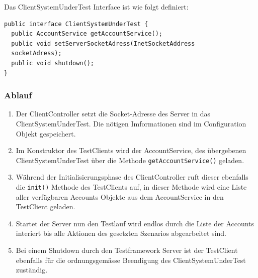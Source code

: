 Das ClientSystemUnderTest Interface ist wie folgt definiert:
\begin{verbatim}
public interface ClientSystemUnderTest {	
  public AccountService getAccountService();
  public void setServerSocketAdress(InetSocketAddress 
  socketAdress);
  public void shutdown();
}	
\end{verbatim}
\subsubsection{Ablauf}
\label{sec:ablauf}
\begin{enumerate}
\item Der ClientController setzt die Socket-Adresse des Server in das Client\-System\-Under\-Test. Die nötigen Imformationen sind im Configuration Objekt gespeichert.
\item Im Kon\-struk\-tor des Test\-Clients wird der Account\-Ser\-vice, des über\-ge\-be\-nen Client\-System\-Under\-Test über die Meth\-ode \texttt{get\allowbreak Account\allowbreak Ser\allowbreak vice()} ge\-la\-den. 
\item Während der Initialisierungsphase des ClientController ruft dieser ebenfalls die \verb+init()+ Methode des TestClients auf, in dieser Methode wird eine Liste aller verfügbaren Accounts Objekte aus dem AccountService in den TestClient geladen.
\item Startet der Server nun den Testlauf wird endlos durch die Liste der Accounts interiert bis alle Aktionen des gesetzten Szenarios abgearbeitet sind.
\item Bei einem Shutdown durch den Testframework Server ist der TestClient ebenfalls für die ord\-nungs\-ge\-mä\-sse Be\-en\-di\-gung des ClientSystemUnderTest zu\-stän\-dig.
\end{enumerate}

